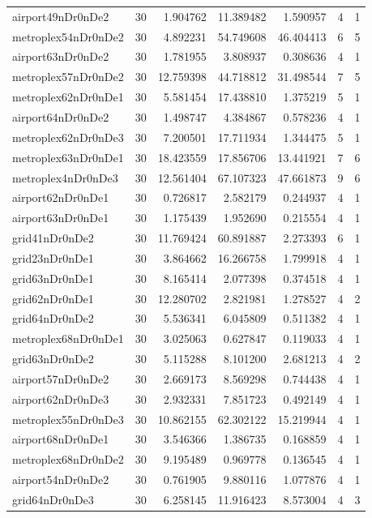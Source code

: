 \documentclass[../../../thesis.tex]{subfiles}
\begin{document}
\begin{longtable}{|l|r|r|r|r|r|r|}
airport49nDr0nDe2 & 30 & 1.904762 & 11.389482 & 1.590957 & 4 & 1 \\
metroplex54nDr0nDe2 & 30 & 4.892231 & 54.749608 & 46.404413 & 6 & 5 \\
airport63nDr0nDe2 & 30 & 1.781955 & 3.808937 & 0.308636 & 4 & 1 \\
metroplex57nDr0nDe2 & 30 & 12.759398 & 44.718812 & 31.498544 & 7 & 5 \\
metroplex62nDr0nDe1 & 30 & 5.581454 & 17.438810 & 1.375219 & 5 & 1 \\
airport64nDr0nDe2 & 30 & 1.498747 & 4.384867 & 0.578236 & 4 & 1 \\
metroplex62nDr0nDe3 & 30 & 7.200501 & 17.711934 & 1.344475 & 5 & 1 \\
metroplex63nDr0nDe1 & 30 & 18.423559 & 17.856706 & 13.441921 & 7 & 6 \\
metroplex4nDr0nDe3 & 30 & 12.561404 & 67.107323 & 47.661873 & 9 & 6 \\
airport62nDr0nDe1 & 30 & 0.726817 & 2.582179 & 0.244937 & 4 & 1 \\
airport63nDr0nDe1 & 30 & 1.175439 & 1.952690 & 0.215554 & 4 & 1 \\
grid41nDr0nDe2 & 30 & 11.769424 & 60.891887 & 2.273393 & 6 & 1 \\
grid23nDr0nDe1 & 30 & 3.864662 & 16.266758 & 1.799918 & 4 & 1 \\
grid63nDr0nDe1 & 30 & 8.165414 & 2.077398 & 0.374518 & 4 & 1 \\
grid62nDr0nDe1 & 30 & 12.280702 & 2.821981 & 1.278527 & 4 & 2 \\
grid64nDr0nDe2 & 30 & 5.536341 & 6.045809 & 0.511382 & 4 & 1 \\
metroplex68nDr0nDe1 & 30 & 3.025063 & 0.627847 & 0.119033 & 4 & 1 \\
grid63nDr0nDe2 & 30 & 5.115288 & 8.101200 & 2.681213 & 4 & 2 \\
airport57nDr0nDe2 & 30 & 2.669173 & 8.569298 & 0.744438 & 4 & 1 \\
airport62nDr0nDe3 & 30 & 2.932331 & 7.851723 & 0.492149 & 4 & 1 \\
metroplex55nDr0nDe3 & 30 & 10.862155 & 62.302122 & 15.219944 & 4 & 1 \\
airport68nDr0nDe1 & 30 & 3.546366 & 1.386735 & 0.168859 & 4 & 1 \\
metroplex68nDr0nDe2 & 30 & 9.195489 & 0.969778 & 0.136545 & 4 & 1 \\
airport54nDr0nDe2 & 30 & 0.761905 & 9.880116 & 1.077876 & 4 & 1 \\
grid64nDr0nDe3 & 30 & 6.258145 & 11.916423 & 8.573004 & 4 & 3 \\

\end{longtable}
\end{document}
